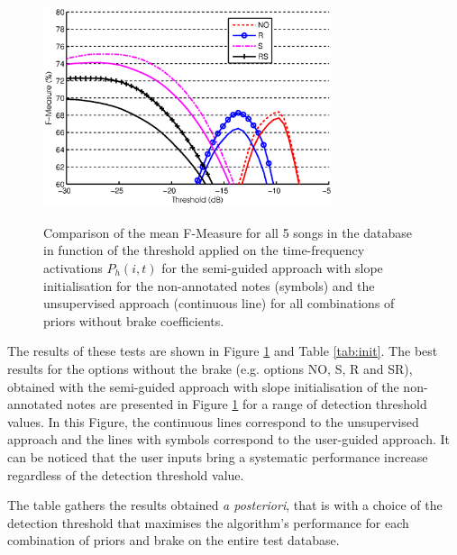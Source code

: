 \documentclass{article}
\begin{document}
\begin{figure}[!ht]
\begin{minipage}[b]{1.0\linewidth}
  \centering
  \centerline{\includegraphics[width=8.5cm, height=6.7cm]{figures/finalnobrake.eps}}
\end{minipage}
\caption{Comparison of the mean F-Measure for all 5 songs in the database in function of the threshold applied on the time-frequency activations $P_h(i,t)$ for the semi-guided approach with slope initialisation for the non-annotated notes (symbols) and the unsupervised approach (continuous line) for all combinations of priors without brake coefficients.}
\label{fig:fxt-nobrake}
\end{figure}

\vspace{0.2cm}

The results of these tests are shown in Figure \ref{fig:fxt-nobrake} and Table \ref{tab:init}. The best results for the options without the brake (e.g. options NO, S, R and SR), obtained with the semi-guided approach with slope initialisation of the non-annotated notes are presented in Figure \ref{fig:fxt-nobrake} for a range of detection threshold values. In this Figure, the continuous lines correspond to the unsupervised approach and the lines with symbols correspond to the user-guided approach.  It can be noticed that the user inputs bring a systematic performance increase regardless of the detection threshold value.

The table gathers the results obtained \textit{a posteriori}, that is with a choice of the detection threshold that maximises the algorithm's performance for each combination of priors and brake on the entire test database.

\vspace{0.2cm}
\end{document}
